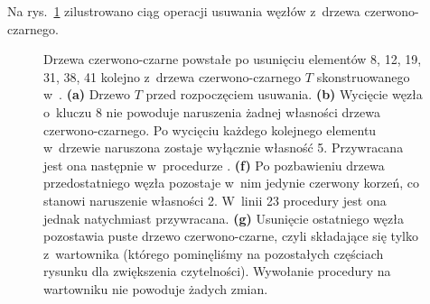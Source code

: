 
\exercise %
\exercise %
\exercise %
Na rys.\ \ref{fig:13.4-3} zilustrowano ciąg operacji usuwania węzłów z~drzewa czerwono-czarnego.
\begin{figure}[ht]
	\centering 
	\caption{Drzewa czerwono-czarne powstałe po usunięciu elementów 8, 12, 19, 31, 38, 41 kolejno z~drzewa czerwono-czarnego $T$ skonstruowanego w~.
	{\sffamily\bfseries(a)} Drzewo $T$ przed rozpoczęciem usuwania.
	{\sffamily\bfseries(b)} Wycięcie węzła o~kluczu 8 nie powoduje naruszenia żadnej własności drzewa czerwono-czarnego.
	{\sffamily\bfseries{}} Po wycięciu każdego kolejnego elementu w~drzewie naruszona zostaje wyłącznie własność 5.
	Przywracana jest ona następnie w~procedurze .
	{\sffamily\bfseries{(f)}} Po pozbawieniu drzewa przedostatniego węzła pozostaje w~nim jedynie czerwony korzeń, co stanowi naruszenie własności 2.
        W~linii 23 procedury  jest ona jednak natychmiast przywracana.
        {\sffamily\bfseries{(g)}} Usunięcie ostatniego węzła pozostawia puste drzewo czerwono-czarne, czyli składające się tylko z~wartownika  (którego pominęliśmy na pozostałych częściach rysunku dla zwiększenia czytelności).
        Wywołanie procedury  na wartowniku nie powoduje żadych zmian.} \label{fig:13.4-3}
\end{figure}

\exercise %
\exercise %
\exercise %
\exercise %
